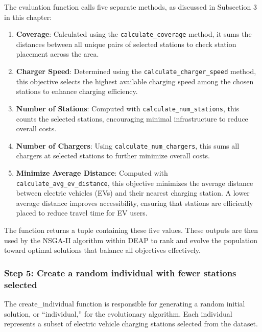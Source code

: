 The evaluation function calls five separate methods, as discussed in Subsection 3 in this chapter:

\begin{enumerate}
    \item \textbf{Coverage}: Calculated using the \texttt{calculate\_coverage} method, it sums the distances between all unique pairs of selected stations to check station placement across the area.
    
    \item \textbf{Charger Speed}: Determined using the \texttt{calculate\_charger\_speed} method, this objective selects the highest available charging speed among the chosen stations to enhance charging efficiency.

    
    \item \textbf{Number of Stations}: Computed with \texttt{calculate\_num\_stations}, this counts the selected stations, encouraging minimal infrastructure to reduce overall costs.
    
    \item \textbf{Number of Chargers}: Using \texttt{calculate\_num\_chargers}, this sums all chargers at selected stations to further minimize overall costs.

    \item \textbf{Minimize Average Distance}: Computed with \texttt{calculate\_avg\_ev\_distance}, this objective minimizes the average distance between electric vehicles (EVs) and their nearest charging station. A lower average distance improves accessibility, ensuring that stations are efficiently placed to reduce travel time for EV users.
    
\end{enumerate}

The function returns a tuple containing these five values. These outputs are then used by the NSGA-II algorithm within DEAP to rank and evolve the population toward optimal solutions that balance all objectives effectively\cite{Multi-Objective Optimization using Evolutionary Algorithms}.


\subsubsection*{Step 5: Create a random individual with fewer stations selected}
The create\_individual function is responsible for generating a random initial solution, or “individual,” for the evolutionary algorithm. Each individual represents a subset of electric vehicle charging stations selected from the dataset.

